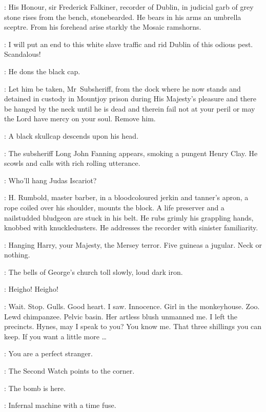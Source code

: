 :
His Honour, sir Frederick Falkiner, recorder of Dublin,
in judicial garb of grey stone rises from the bench, stonebearded.
He bears in his arms an umbrella sceptre.
From his forehead arise starkly the Mosaic ramshorns.

\Recorder:
I will put an end to this white slave traffic
and rid Dublin of this odious pest.
Scandalous!

:
He dons the black cap.

\Recorder:
Let him be taken, Mr~Subsheriff, from the dock where he now stands
and detained in custody in Mountjoy prison during His Majesty's pleasure
and there be hanged by the neck until he is dead
and therein fail not at your peril or may the Lord have mercy on your soul.
Remove him.

:
A black skullcap descends upon his head.

:
The subsheriff Long John Fanning appears, smoking a pungent Henry Clay.
He scowls and calls with rich rolling utterance.

\LongJohn:
Who'll hang Judas Iscariot?

:
H. Rumbold, master barber, in a bloodcoloured jerkin and tanner's apron,
a rope coiled over his shoulder, mounts the block.
A life preserver and a nailstudded bludgeon are stuck in his belt.
He rubs grimly his grappling hands,
knobbed with knuckledusters.
He addresses the recorder with sinister familiarity.

\Rumbold:
Hanging Harry, your Majesty, the Mersey terror.
Five guineas a jugular.
Neck or nothing.

:
The bells of George's church toll slowly, loud dark iron.

\Bells:
Heigho! Heigho!

\Bloom:
Wait. Stop.
Gulls.
Good heart.
I saw.
Innocence.
Girl in the monkeyhouse.
Zoo.
Lewd chimpanzee.
Pelvic basin.
Her artless blush unmanned me.
I left the precincts.
Hynes, may I speak to you?
You know me.
That three shillings you can keep.
If you want a little more \ldots

\Hynes[1]:
You are a perfect stranger.

:
The Second Watch points to the corner.

\SecondWatch:
The bomb is here.

\FirstWatch:
Infernal machine with a time fuse.

